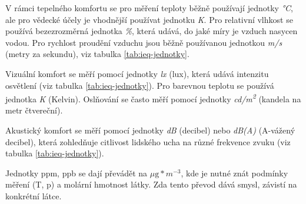 V rámci tepelného komfortu se pro měření teploty běžně používají jednotky \textit{°C}, ale pro vědecké účely je vhodnější používat jednotku \textit{K}. Pro relativní vlhkost se používá bezezrozměrná jednotka \textit{\%}, která udává, do jaké míry je vzduch nasycen vodou. Pro rychlost proudění vzduchu jsou běžně používanou jednotkou \textit{m/s} (metry za sekundu), viz tabulka \ref{tab:ieq-jednotky}.\parencite{dengImpactIndoorAir2024} 

Vizuální komfort se měří pomocí jednotky \textit{lx} (lux), která udává intenzitu osvětlení (viz tabulka \ref{tab:ieq-jednotky}). Pro barevnou teplotu se používá jednotka \textit{K} (Kelvin). Oslňování se často měří pomocí jednotky \textit{cd/m\textsuperscript{2}} (kandela na metr čtvereční).\parencite{dengImpactIndoorAir2024}

Akustický komfort se měří pomocí jednotky \textit{dB} (decibel) nebo \textit{dB(A)} (A-vážený decibel), která zohledňuje citlivost lidského ucha na různé frekvence zvuku (viz tabulka \ref{tab:ieq-jednotky}).\parencite{dengImpactIndoorAir2024,mcminnAWeightingMetric2013,marshIEC61672NewInternational2001}

Jednotky ppm, ppb se dají převádět na $\mu\text{g}*m^{-3}$, kde je nutné znát podmínky měření (T, p) a molární hmotnost látky. Zda tento převod dává smysl, závistí na konkrétní látce.\parencite{worldhealthorganizationWHOGlobalAir2021}

